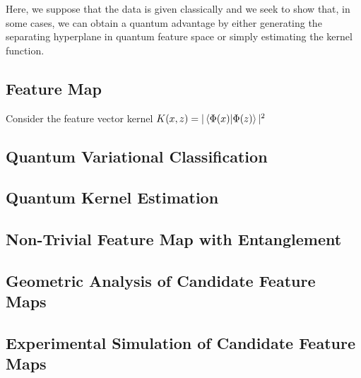 \documentclass[main.tex]{subfiles}
\begin{document}
Here, we suppose that the data is given classically and we seek to show that, in some cases, we can obtain a quantum advantage by either generating the separating hyperplane in quantum feature space or simply estimating the kernel function.

\subsection{Feature Map}

Consider the feature vector kernel $K(x, z) = | \bra{\Phi(x)}\ket{\Phi(z)} |^2$

\subsection{Quantum Variational Classification}

\subsection{Quantum Kernel Estimation}

\subsection{Non-Trivial Feature Map with Entanglement}

\subsection{Geometric Analysis of Candidate Feature Maps}

\subsection{Experimental Simulation of Candidate Feature Maps}

%
%
\end{document}
